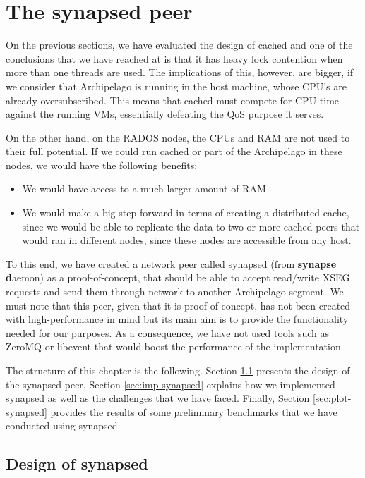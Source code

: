 \chapter{The synapsed peer}\label{ch:synapsed}

On the previous sections, we have evaluated the design of cached and one of the 
conclusions that we have reached at is that it has heavy lock contention when 
more than one threads are used. The implications of this, however, are bigger, 
if we consider that Archipelago is running in the host machine, whose CPU's are 
already oversubscribed. This means that cached must compete for CPU time 
against the running VMs, essentially defeating the QoS purpose it serves.

On the other hand, on the RADOS nodes, the CPUs and RAM are not used to their 
full potential. If we could run cached or part of the Archipelago in these 
nodes, we would have the following benefits:

\begin{itemize}
	\item We would have access to a much larger amount of RAM
	\item We would make a big step forward in terms of creating a 
		distributed cache, since we would be able to replicate the data 
		to two or more cached peers that would ran in different nodes, 
		since these nodes are accessible from any host.
\end{itemize}

To this end, we have created a network peer called synapsed (from 
\textbf{synapse d}aemon) as a proof-of-concept, that should be able to accept 
read/write XSEG requests and send them through network to another Archipelago 
segment. We must note that this peer, given that it is proof-of-concept, has 
not been created with high-performance in mind but its main aim is to provide 
the functionality needed for our purposes.  As a consequence, we have not used 
tools such as ZeroMQ or libevent that would boost the performance of the 
implementation.

The structure of this chapter is the following. Section 
\ref{sec:design-synapsed} presents the design of the synapsed peer. Section 
\ref{sec:imp-synapsed} explains how we implemented synapsed as well as the 
challenges that we have faced. Finally, Section \ref{sec:plot-synapsed} 
provides the results of some preliminary benchmarks that we have conducted 
using synapsed.

\section{Design of synapsed}\label{sec:design-synapsed}

